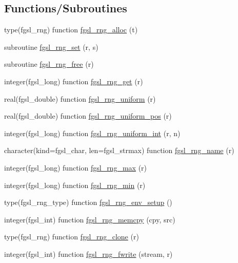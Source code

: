 \subsection*{Functions/\+Subroutines}
\begin{DoxyCompactItemize}
\item 
type(fgsl\+\_\+rng) function \hyperlink{rng_8finc_a30f2372e956b9bd66f43de5c6de060d9}{fgsl\+\_\+rng\+\_\+alloc} (t)
\item 
subroutine \hyperlink{rng_8finc_a4bff01c18fd9fbf639fd6d8e75c9e85a}{fgsl\+\_\+rng\+\_\+set} (r, s)
\item 
subroutine \hyperlink{rng_8finc_af0801f3c2ac80076ea94f4b0393665a0}{fgsl\+\_\+rng\+\_\+free} (r)
\item 
integer(fgsl\+\_\+long) function \hyperlink{rng_8finc_a437565a21cf12f8aa87eec1ec36ff143}{fgsl\+\_\+rng\+\_\+get} (r)
\item 
real(fgsl\+\_\+double) function \hyperlink{rng_8finc_aa854677900243f9feabf49ee137e38b9}{fgsl\+\_\+rng\+\_\+uniform} (r)
\item 
real(fgsl\+\_\+double) function \hyperlink{rng_8finc_a787ed01d91454a49a28d4344d35559cf}{fgsl\+\_\+rng\+\_\+uniform\+\_\+pos} (r)
\item 
integer(fgsl\+\_\+long) function \hyperlink{rng_8finc_ae0ce08aee233600b619e3ddc2bcb0ef2}{fgsl\+\_\+rng\+\_\+uniform\+\_\+int} (r, n)
\item 
character(kind=fgsl\+\_\+char, len=fgsl\+\_\+strmax) function \hyperlink{rng_8finc_a54c05ff204ef98053bf5124603d2b334}{fgsl\+\_\+rng\+\_\+name} (r)
\item 
integer(fgsl\+\_\+long) function \hyperlink{rng_8finc_afa55230f7211ea98414429229b64a8c4}{fgsl\+\_\+rng\+\_\+max} (r)
\item 
integer(fgsl\+\_\+long) function \hyperlink{rng_8finc_a61f73ec296fa294c6b0634533d537d01}{fgsl\+\_\+rng\+\_\+min} (r)
\item 
type(fgsl\+\_\+rng\+\_\+type) function \hyperlink{rng_8finc_a398d0b93637d4cd2f0ec42aa9d704fed}{fgsl\+\_\+rng\+\_\+env\+\_\+setup} ()
\item 
integer(fgsl\+\_\+int) function \hyperlink{rng_8finc_a3b20f59958b9d1f96e11c91deb33eebb}{fgsl\+\_\+rng\+\_\+memcpy} (cpy, src)
\item 
type(fgsl\+\_\+rng) function \hyperlink{rng_8finc_acc66804b594701e03a27cea42373fac6}{fgsl\+\_\+rng\+\_\+clone} (r)
\item 
integer(fgsl\+\_\+int) function \hyperlink{rng_8finc_ad9f602fa3c592fdac3659a1746143aa1}{fgsl\+\_\+rng\+\_\+fwrite} (stream, r)

\end{DoxyCompactItemize}
